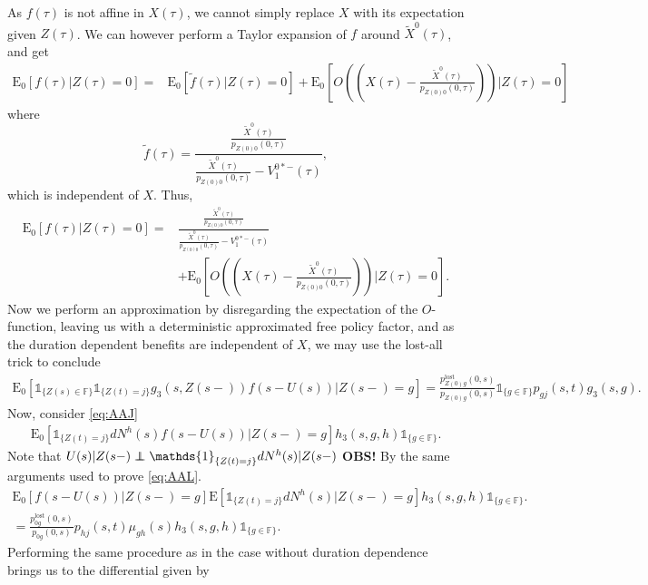 \documentclass[12pt]{article}
\newcommand{\E}{\text{E}}
\newcommand{\indic}[1]{\mathds{1}_{ \{ #1 \} }}
\newcommand\independent{\protect\mathpalette{\protect\independenT}{\perp}}
\def\independenT#1#2{\mathrel{\rlap{$#1#2$}\mkern2mu{#1#2}}}
\theoremstyle{my_thm}
\begin{document}
As $f(\tau)$ is not affine in $X(\tau)$, we cannot simply replace $X$ with its expectation given $Z(\tau)$. We can however perform a Taylor expansion of $f$ around $\tilde{X}^0(\tau)$, and get
\begin{align*}
\E_0[f(\tau) |Z(\tau)=0]
=&
\E_0[\tilde{f}(\tau) |Z(\tau)=0]+ 
\E_0 \left[ O \left( \left( X(\tau)-\frac{\tilde{X}^0(\tau)}{p_{Z(0)0}(0,\tau)} \right)  \right) \bigg| Z(\tau)=0 \right]
\end{align*}
where 
$$
\tilde{f}(\tau)=
\frac{
	\frac{\tilde{X}^0(\tau)}{p_{Z(0)0}(0,\tau)}
}{
	\frac{\tilde{X}^0(\tau)}{p_{Z(0)0}(0,\tau)}
	-V_1^{0*-}(\tau)
},
$$
which is independent of $X$. Thus,
\begin{align*}
\E_0[f(\tau) |Z(\tau)=0]
=&
\frac{
	\frac{\tilde{X}^0(\tau)}{p_{Z(0)0}(0,\tau)}
}{
	\frac{\tilde{X}^0(\tau)}{p_{Z(0)0}(0,\tau)}
	-V_1^{0*-}(\tau)
}
\\
&+
\E_0 \left[ O \left( \left( X(\tau)-\frac{\tilde{X}^0(\tau)}{p_{Z(0)0}(0,\tau)} \right)  \right) \bigg| Z(\tau)=0 \right].
\end{align*}
Now we perform an approximation by disregarding the expectation of the $O$-function, leaving us with a deterministic approximated free policy factor, and as the duration dependent benefits are independent of $X$, we may use the lost-all trick to conclude
\begin{align*}
\E_0 [ \indic{Z(s) \in \mathbb{F}} \indic{Z(t)=j} g_3(s,Z(s-)) f(s-U(s))|Z(s-)=g]
=
\frac{p^{\text{lost}}_{Z(0)g}(0,s)}{p_{Z(0)g}(0,s)} \indic{g \in \mathbb{F}} p_{gj}(s,t)g_3(s,g).
\end{align*}
Now, consider \eqref{eq:AAJ}
\begin{align*}
\E_0 [  \indic{Z(t)=j}  dN^h(s) f(s-U(s))|Z(s-)=g] h_3(s,g,h) \indic{g \in \mathbb{F}}.
\end{align*}
Note that $U(s)|Z(s-) \independent \indic{Z(t)=j}dN^h(s)|Z(s-)$ \textbf{OBS!} By the same arguments used to prove \eqref{eq:AAL}.
\begin{align*}
\E_0[f(s-U(s))|Z(s-)=g] \E[ \indic{Z(t)=j}dN^h(s) |Z(s-)=g] h_3(s,g,h) \indic{g \in \mathbb{F}}.
\\
=\frac{p_{0g}^\text{lost}(0,s)}{p_{0g}(0,s)} p_{hj}(s,t) \mu_{gh}(s) h_3(s,g,h) \indic{g \in \mathbb{F}}.
\end{align*}
Performing the same procedure as in the case without duration dependence brings us to the differential given by
\end{document}

